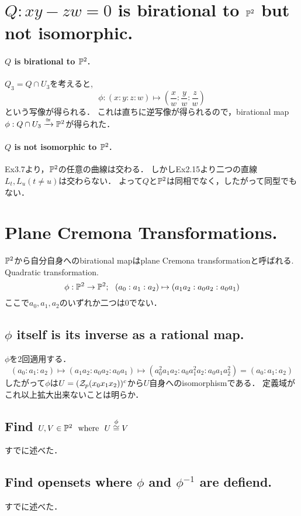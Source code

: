 \documentclass[a4paper]{jsarticle}
\newcommand{\bimap}{\xrightarrow{\iso}}
\begin{document}
\section{$Q:xy-zw=0$ is birational to $\mathbb{P}^2$ but not isomorphic.} %
    \paragraph{$Q$ is birational to $\mathbb{P}^2$.}
    $Q_3=Q \cap U_3$を考えると,
    \[ \phi:(x:y:z:w) \mapsto \left( \frac{x}{w}:\frac{y}{w}:\frac{z}{w} \right) \]
    という写像が得られる．
    これは直ちに逆写像が得られるので，birational map $\phi: Q \cap U_3 \bimap \proj^2$が得られた．

    \paragraph{$Q$ is not isomorphic to $\mathbb{P}^2$.}
    Ex3.7より，$\mathbb{P}^2$の任意の曲線は交わる．
    しかしEx2.15より二つの直線$L_t, L_u (t \neq u)$は交わらない．
    よって$Q$と$\mathbb{P}^2$は同相でなく，したがって同型でもない．

\section{Plane Cremona Transformations.} %
    $\mathbb{P}^2$から自分自身へのbirational mapはplane Cremona transformationと呼ばれる.
    Quadratic transformation.
    \[ \phi: \mathbb{P}^2 \to \mathbb{P}^2;~~ (a_0:a_1:a_2) \mapsto (a_1 a_2:a_0 a_2:a_0 a_1) \]
    ここで$a_0,a_1,a_2$のいずれか二つは0でない．

    \subsection{$\phi$ itself is its inverse as a rational map.}
    $\phi$を2回適用する．
    \[ (a_0:a_1:a_2) \mapsto (a_1 a_2:a_0 a_2:a_0 a_1) \mapsto (a_0^2 a_1 a_2:a_0 a_1^2 a_2:a_0 a_1 a_2^2)=(a_0:a_1:a_2) \]
    したがって$\phi$は$U=(\mathcal{Z}_p(x_0 x_1 x_2))^c$から$U$自身へのisomorphismである．
    定義域がこれ以上拡大出来ないことは明らか．

    \subsection{Find $U,V \in \mathbb{P}^2 ~~\text{where}~~ U \overset{\phi}{\cong} V$}
    すでに述べた．

    \subsection{Find opensets where $\phi$ and $\phi^{-1}$ are defiend.}
    すでに述べた．
\end{document}

